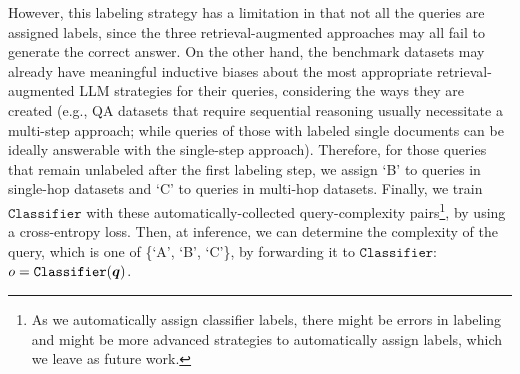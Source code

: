However, this labeling strategy has a limitation in that not all the queries are assigned labels, since the three retrieval-augmented approaches may all fail to generate the correct answer. On the other hand, the benchmark datasets may already have meaningful inductive biases about the most appropriate retrieval-augmented LLM strategies for their queries, considering the ways they are created (e.g., QA datasets that require sequential reasoning usually necessitate a multi-step approach; while queries of those with labeled single documents can be ideally answerable with the single-step approach). Therefore, for those queries that remain unlabeled after the first labeling step, we assign `B' to queries in single-hop datasets and `C' to queries in multi-hop datasets. Finally, we train $\texttt{Classifier}$ with these automatically-collected query-complexity pairs\footnote{As we automatically assign classifier labels, there might be errors in labeling and might be more advanced strategies to automatically assign labels, which we leave as future work.}, by using a cross-entropy loss. Then, at inference, we can determine the complexity of the query, which is one of \{`A', `B', `C'\}, by forwarding it to $\texttt{Classifier}$: $o = \texttt{Classifier}({\bm{q}})$.
